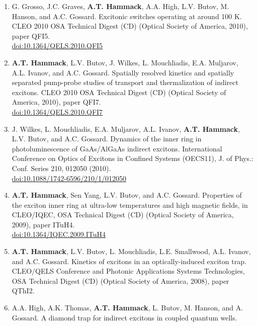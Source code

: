 {\begin{enumerate}[resume]
{        }
        \item {
        G. Grosso, J.C. Graves, \textbf{A.T. Hammack}, A.A. High, L.V. Butov, M. Hanson, and A.C. Gossard.
        Excitonic switches operating at around 100 K.
        CLEO 2010 OSA Technical Digest (CD) (Optical Society of America, 2010), paper QFI5.
        \\ \href{https://doi.org/10.1364/QELS.2010.QFI5}{doi:10.1364/QELS.2010.QFI5}
        }
        \item {
        \textbf{A.T. Hammack}, L.V. Butov, J. Wilkes, L. Mouchliadis, E.A. Muljarov, A.L. Ivanov, and A.C. Gossard.
        Spatially resolved kinetics and spatially separated pump-probe studies of transport and thermalization of indirect excitons.
        CLEO 2010 OSA Technical Digest (CD) (Optical Society of America, 2010), paper QFI7.
        \\ \href{https://doi.org/10.1364/QELS.2010.QFI7}{doi:10.1364/QELS.2010.QFI7}
        }
        \item {
        J. Wilkes, L. Mouchliadis, E.A. Muljarov, A.L. Ivanov, \textbf{A.T. Hammack}, L.V. Butov, and A.C. Gossard.
        Dynamics of the inner ring in photoluminescence of GaAs/AlGaAs indirect excitons. 
        International Conference on Optics of Excitons in Conﬁned Systems (OECS11), J. of Phys.: Conf. Series 210, 012050 (2010).
        \\ \href{https://doi.org/10.1088/1742-6596/210/1/012050}{doi:10.1088/1742-6596/210/1/012050}
        }
        \item {
        \textbf{A.T. Hammack}, Sen Yang, L.V. Butov, and A.C. Gossard. 
        Properties of the exciton inner ring at ultra-low temperatures and high magnetic ﬁelds, 
        in CLEO/IQEC, OSA Technical Digest (CD) (Optical Society of America, 2009), paper ITuH4.
        \\ \href{https://doi.org/10.1364/IQEC.2009.ITuH4}{doi:10.1364/IQEC.2009.ITuH4}
        }
        \item {
        \textbf{A.T. Hammack}, L.V. Butov, L. Mouchliadis, L.E. Smallwood, A.L. Ivanov, and A.C. Gossard. 
        Kinetics of excitons in an optically-induced exciton trap.
        CLEO/QELS Conference and Photonic Applications Systems Technologies, OSA Technical Digest (CD) (Optical Society of America, 2008), paper QThI2. 
        }
        \item {
        A.A. High, A.K. Thomas, \textbf{A.T. Hammack}, L. Butov, M. Hanson, and A. Gossard. 
        A diamond trap for indirect excitons in coupled quantum wells.
}
\end{enumerate}}
